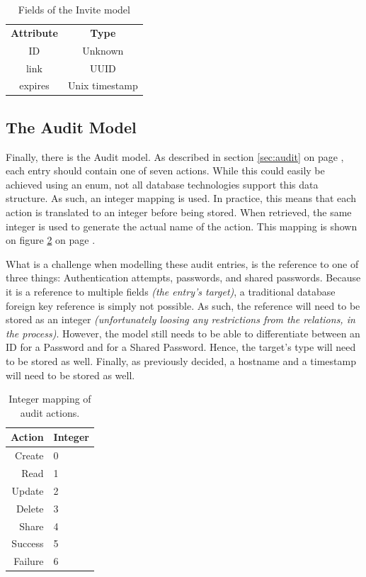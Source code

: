 			\begin{table}[p]
				\centering
				\begin{tabular}{c|c}
					\textbf{Attribute} 		& \textbf{Type} 		\\
					ID 						& Unknown 		\\
					link  					& UUID \\
					expires 				& Unix timestamp \\
				\end{tabular}
				\caption{Fields of the Invite model}
				\label{fig:model:invite}
			\end{table}

		\subsection{The Audit Model}
			\label{sec:moddeling:audit}
			Finally, there is the Audit model. As described in section \ref{sec:audit} on page \pageref{sec:audit}, each entry should contain one of seven actions. While this could easily be achieved using an enum, not all database technologies support this data structure. As such, an integer mapping is used. In practice, this means that each action is translated to an integer before being stored. When retrieved, the same integer is used to generate the actual name of the action. This mapping is shown on figure \ref{table:audit:actionmapping} on page \pageref{table:audit:actionmapping}.

			What is a challenge when modelling these audit entries, is the reference to one of three things: Authentication attempts, passwords, and shared passwords. Because it is a reference to multiple fields \emph{(the entry's target)}, a traditional database foreign key reference is simply not possible. As such, the reference will need to be stored as an integer \emph{(unfortunately loosing any restrictions from the relations, in the process)}. However, the model still needs to be able to differentiate between an ID for a Password and for a Shared Password. Hence, the target's type will need to be stored as well. Finally, as previously decided, a hostname and a timestamp will need to be stored as well.

			\begin{table}[h!]
				\centering
				\begin{tabular}{r | l}
					\textbf{Action} 	& \textbf{Integer} 	\\
					\hline
					Create 				& 0 				\\
					Read 				& 1 				\\
					Update 				& 2 				\\
					Delete 				& 3 				\\
					Share 				& 4 				\\
					Success 			& 5 				\\
					Failure 			& 6 				\\					
				\end{tabular}
				\caption{Integer mapping of audit actions.}
				\label{table:audit:actionmapping}
			\end{table}

